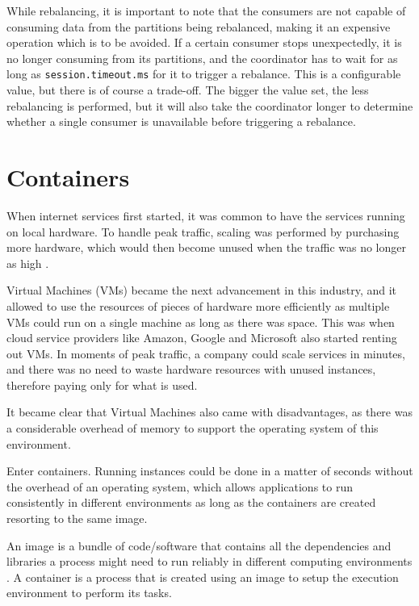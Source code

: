 While rebalancing, it is important to note that the consumers are not capable of
consuming data from the partitions being rebalanced, making it an expensive
operation which is to be avoided. If a certain consumer stops unexpectedly, it
is no longer consuming from its partitions, and the coordinator has to wait for
as long as \lstinline{session.timeout.ms} for it to trigger a rebalance. This is a
configurable value, but there is of course a trade-off. The bigger the value
set, the less rebalancing is performed, but it will also take the coordinator
longer to determine whether a single consumer is unavailable before triggering a
rebalance. 

\section{Containers} \label{sec:COM}

When internet services first started, it was common to have the services running
on local hardware. To handle peak traffic, scaling was performed by purchasing
more hardware, which would then become unused when the traffic was no longer as
high \cite[Chapter~1]{smith2017docker}.

Virtual Machines (VMs) became the next advancement in this industry, and it allowed
to use the resources of pieces of hardware more efficiently as multiple VMs
could run on a single machine as long as there was space. This was when cloud
service providers like Amazon, Google and Microsoft also started renting out
VMs. In moments of peak traffic, a company could scale services in minutes, and
there was no need to waste hardware resources with unused instances, therefore
paying only for what is used.

It became clear that Virtual Machines also came with disadvantages, as there was
a considerable overhead of memory to support the operating system of this
environment.

Enter containers. Running instances could be done in a matter of seconds without
the overhead of an operating system, which allows applications to run
consistently in different environments as long as the containers are created
resorting to the same image.

An image is a bundle of code/software that contains all the dependencies and
libraries a process might need to run reliably in different computing
environments \cite{DockerContainer}. A container is a process that is created using an image to
setup the execution environment to perform its tasks.


